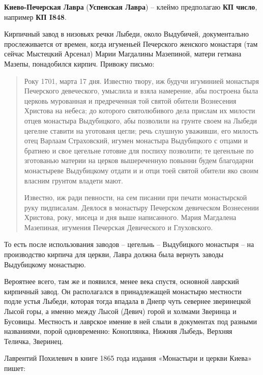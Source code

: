 
\noindent\textbf{Киево-Печерская Лавра} (\textbf{Успенская Лавра}) – клеймо предполагаю \textbf{КП число}, например \textbf{КП I848}.

Кирпичный завод в низовьях речки Лыбеди, около Выдубичей, документально прослеживается от времен, когда игуменьей Печерского женского монастаря (там сейчас Мыстецкий Арсенал) Марии Магдалины Мазепиной, матери гетмана Мазепы, понадобился кирпич. Привожу письмо:

\begin{quotation}
Року 1701, марта 17 дня. Известно твору, иж будучи игуминией монастыря Печерского девеческого, умыслила и взяла намерение, абы построена была церковь мурованная и предреченная той святой обители Вознесения Христова на небеса; до которого святолюбивого дела прислам их милости отцев монастыра Выдубицкого, абы позволили на грунте своем на Лыбеди цегелне ставити на уготованя цегли; речь слушную уваживши, его милость отец Варлаам Страховский, игумен монастыра Выдубицкого с отцами и братиею и свое цегельне готовие для поспиху позволити; те цегенльне по зготованью материи на церков вышереченную повынни будем благодарни монастыреве Выдубицкому отдати и и отци тоей святой обители яко своим власним грунтом владети мают. 

Известно, иж ради певности, на сем писании при печати монастырской руку пидписалам. Деялося в монастыру Печерском девическом Вознесении Христова, року, мисеца и дня выше написанного. Мария Магдалена Мазепиная, игумения Печерская Девического и Глуховского.\end{quotation}

То есть после использования заводов – цегельнь – Выдубицкого монастыря – на производство кирпича для церкви, Лавра должна была вернуть заводы Выдубицкому монастырю. 

Вероятнее всего, там же и появился, менее века спустя, основной лаврский кирпичный завод. Он располагался в принадлежащей монастырю местности подле устья Лыбеди, которая тогда впадала в Днепр чуть севернее зверинецкой Лысой горы, а именно между Лысой (Девич) горой и холмами Зверинца и Бусовицы. Местность и лаврское имение в ней слыли в документах под разными названиями, порой одновременно: Коноплянка, Нижняя Лыбедь, Верхняя Теличка, Зверинец.

Лаврентий Похилевич в книге 1865 года издания «Монастыри и церкви Киева»\cite{pohilmon} пишет:

